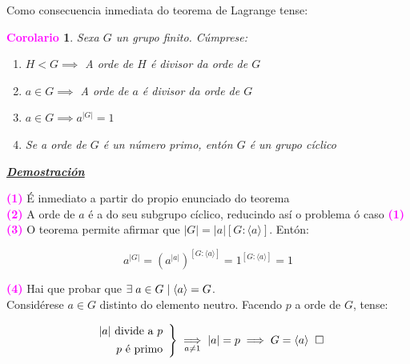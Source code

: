 \documentclass[twoside]{report}
\newcommand{\magbf}[1]{\textcolor{magenta}{\textbf{#1}}} %
\theoremstyle{mystyle}
\newtheorem{cor}{\magbf{Corolario}}[chapter]
\newenvironment{corollary}
{\begin{mdframed}[linecolor = magenta,backgroundcolor = classicrose, linewidth = 2mm]\begin{cor}}
{\end{cor}\end{mdframed}}
\begin{document}
\vspace{4mm}

\noindent Como consecuencia inmediata do teorema de Lagrange tense: \\
\begin{corollary} \label{cor1.1}
Sexa $G$ un grupo finito. Cúmprese:
\begin{enumerate}
    \item $H < G \implies$ A orde de $H$ é divisor da orde de $G$
    \item $a \in G \implies$ A orde de $a$ é divisor da orde de $G$
    \item $a \in G \implies a^{|G|} = 1$
    \item Se a orde de $G$ é un número primo, entón $G$ é un grupo cíclico
\end{enumerate}
\end{corollary}

\vspace{2mm}

\noindent \textbf{\textit{\underline{Demostración}}}

\vspace{2mm}

\noindent \magbf{(1)} É inmediato a partir do propio enunciado do teorema \\

\noindent \magbf{(2)} A orde de $a$ é a do seu subgrupo cíclico, reducindo así o problema ó caso \magbf{(1)} \\

\noindent \magbf{(3)} O teorema permite afirmar que $|G| = |a|[G:\langle a \rangle]$. Entón:

$$a^{|G|} = {(a^{|a|})}^{[G:\langle a \rangle]} = 1^{[G:\langle a \rangle]} = 1$$

\noindent \magbf{(4)} Hai que probar que $\exists \hspace{1mm} a \in G \hspace{1mm} | \hspace{1mm} \langle a \rangle = G$.\\

\noindent Considérese $a \in G$ distinto do elemento neutro. Facendo $p$ a orde de $G$, tense:

\[ 
\left. \begin{array}{r} 
|a| \text{ divide a } p\\[1ex]
p \text{ é primo}
\end{array} \right\} 
\underset{a \neq 1}{\implies} |a| = p \implies G = \langle a \rangle \hspace{2mm} \square
\]
\end{document}
